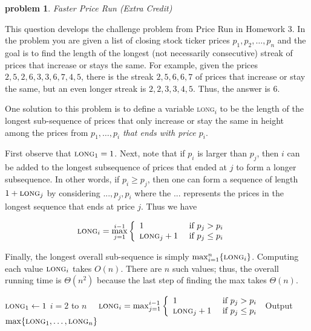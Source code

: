 \documentclass[11pt]{article}
\newtheorem{problem}{\sc\color{cit}problem}
\begin{document}
\begin{problem}{Faster Price Run} (Extra Credit)\end{problem}
This question develops the challenge problem from Price Run in Homework 3.
In the problem you are given a list of closing stock ticker prices $p_1,p_2,\ldots,p_n$ and the goal is to find the length of the longest (not necessarily consecutive) streak of prices  that  increase or stays the same.  For example, given the prices $2,5,2,6,3,3,6,7,4,5$, there is the streak $2,5,6,6,7$ of prices that increase  or stay the same, but an even longer streak is $2,2,3,3,4,5$. Thus, the answer is 6.  

One solution to this problem is to define a variable \textsc{long}$_i$ to be the length of the longest sub-sequence of prices that only increase or stay the same in height among the prices from $p_{1},\ldots,p_i$ \emph{that ends with price $p_i$}. 

First observe that $\textsc{long}_1=1$. Next, note that if  $p_i$ is larger than $p_j$, then  $i$ can be added to the longest subsequence of prices that ended at $j$ to form a longer subsequence. 
In other words, if  $p_{i} \geq p_j$, then one can form
a sequence of length $1+\textsc{long}_j$ by considering 
$...,p_{j},p_{i}$ where the $...$ represents the prices in the 
longest sequence that ends at price $j$. Thus we have

\begin{align}
\textsc{long}_{i}  &= \max_{j=1}^{i-1} \left\{ \begin{array}{lr}
1 & \textrm{ if } p_{j} > p_i \\
\textsc{long}_{j}+1 & \textrm{ if } p_{j} \leq p_i
\end{array}\right. \label{mupdate}
\end{align}


Finally, the longest overall sub-sequence is simply $\max_{i=1}^n\{ \textsc{long}_i \}$. Computing each value $\textsc{long}_i$ takes $O(n)$.  There are $n$ such values; thus, the overall running time is $\Theta(n^2)$
because the last step of finding the max takes $\Theta(n)$.

\begin{codebox}
\li $\textsc{long}_1 \gets 1$ 
\li \For $i=2$ to $n$
\li \ \ $\textsc{long}_{i}  = \max_{j=1}^{i-1} \left\{ \begin{array}{lr} 1 & \textrm{ if } p_{j} > p_i \\ \textsc{long}_{j}+1 & \textrm{ if } p_{j} \leq p_i \end{array}\right.$ \label{line:loop}
\li Output $\max\{\textsc{long}_1,\ldots,\textsc{long}_n\}$
\end{codebox}
\end{document}
